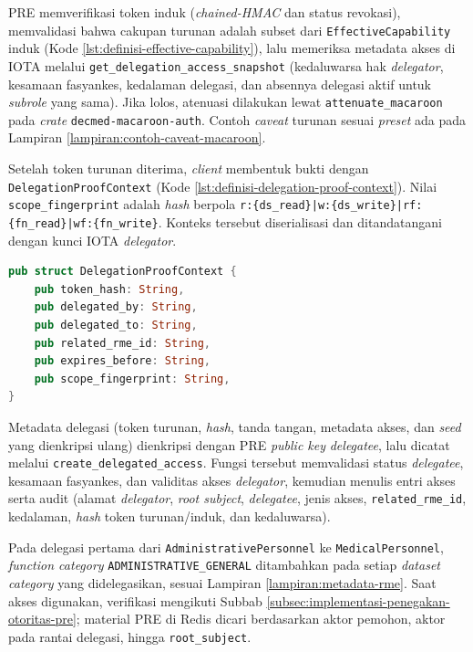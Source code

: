 PRE memverifikasi token induk (\textit{chained-HMAC} dan status revokasi), memvalidasi bahwa cakupan turunan adalah subset dari \texttt{EffectiveCapability} induk (Kode \ref{lst:definisi-effective-capability}), lalu memeriksa metadata akses di IOTA melalui \texttt{get\_delegation\_access\_snapshot} (kedaluwarsa hak \textit{delegator}, kesamaan fasyankes, kedalaman delegasi, dan absennya delegasi aktif untuk \textit{subrole} yang sama). Jika lolos, atenuasi dilakukan lewat \texttt{attenuate\_macaroon} pada \textit{crate} \texttt{decmed-macaroon-auth}. Contoh \textit{caveat} turunan sesuai \textit{preset} ada pada Lampiran \ref{lampiran:contoh-caveat-macaroon}.

Setelah token turunan diterima, \textit{client} membentuk bukti dengan \texttt{DelegationProofContext} (Kode \ref{lst:definisi-delegation-proof-context}). Nilai \texttt{scope\_fingerprint} adalah \textit{hash} berpola \verb!r:{ds_read}|w:{ds_write}|rf:{fn_read}|wf:{fn_write}!. Konteks tersebut diserialisasi dan ditandatangani dengan kunci IOTA \textit{delegator}.

\begin{lstlisting}[language=Rust, caption={Definisi \texttt{DelegationProofContext}}, label={lst:definisi-delegation-proof-context}]
pub struct DelegationProofContext {
    pub token_hash: String,
    pub delegated_by: String,
    pub delegated_to: String,
    pub related_rme_id: String,
    pub expires_before: String,
    pub scope_fingerprint: String,
}
\end{lstlisting}

Metadata delegasi (token turunan, \textit{hash}, tanda tangan, metadata akses, dan \textit{seed} yang dienkripsi ulang) dienkripsi dengan PRE \textit{public key} \textit{delegatee}, lalu dicatat melalui \texttt{create\_delegated\_access}. Fungsi tersebut memvalidasi status \textit{delegatee}, kesamaan fasyankes, dan validitas akses \textit{delegator}, kemudian menulis entri akses serta audit (alamat \textit{delegator}, \textit{root subject}, \textit{delegatee}, jenis akses, \texttt{related\_rme\_id}, kedalaman, \textit{hash} token turunan/induk, dan kedaluwarsa).

Pada delegasi pertama dari \texttt{AdministrativePersonnel} ke \texttt{MedicalPersonnel}, \textit{function category} \texttt{ADMINISTRATIVE\_GENERAL} ditambahkan pada setiap \textit{dataset category} yang didelegasikan, sesuai Lampiran \ref{lampiran:metadata-rme}. Saat akses digunakan, verifikasi mengikuti Subbab \ref{subsec:implementasi-penegakan-otoritas-pre}; material PRE di Redis dicari berdasarkan aktor pemohon, aktor pada rantai delegasi, hingga \texttt{root\_subject}.
